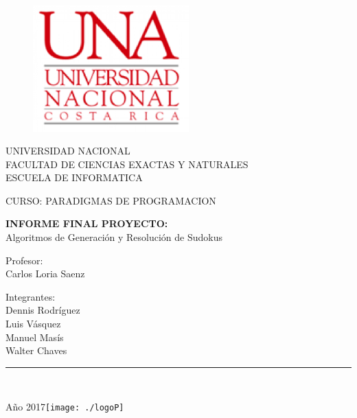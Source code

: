\documentclass[a4paper,openright,12pt]{report}
\begin{document}
\begin{titlepage}

\begin{center}
\vspace*{-1in}
\begin{figure}[htb]
\begin{center}
\includegraphics[width=6cm]{./logo}
\end{center}
\end{figure}
UNIVERSIDAD NACIONAL\\
\vspace*{0.15in}
FACULTAD DE CIENCIAS EXACTAS Y NATURALES\\
\vspace*{0.15in}
ESCUELA DE INFORMATICA\\
\vspace*{0.6in}
\begin{Large}
CURSO: PARADIGMAS DE PROGRAMACION\\
\end{Large}
\vspace*{0.2in}
\begin{Large}
\textbf{INFORME FINAL PROYECTO:}\\
Algoritmos de Generación y Resolución de Sudokus\\
\end{Large}
\vspace*{0.5in}
\begin{large}
Profesor:\\
Carlos Loria Saenz\\
\end{large}
\vspace*{0.3in}
\begin{large}
Integrantes:\\
Dennis Rodríguez\\
Luis Vásquez\\
Manuel Masís\\
Walter Chaves\\
\end{large}
\vspace*{0.3in}
\rule{80mm}{0.1mm}\\
\vspace*{0.1in}
\begin{large}
Año 2017\texttt{[image: ./logoP]}
\date{\today}
\end{large}
\end{center}

\end{titlepage}
\end{document}
